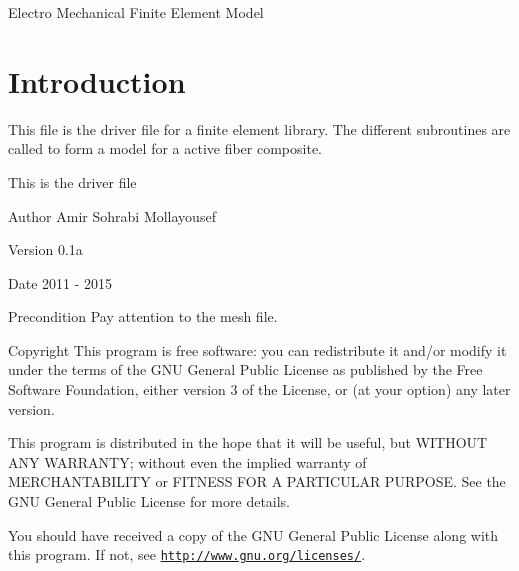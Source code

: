 Electro Mechanical Finite Element Model \hypertarget{index_intro_sec}{}\section{Introduction}\label{index_intro_sec}
This file is the driver file for a finite element library. The different subroutines are called to form a model for a active fiber composite.

This is the driver file \begin{DoxyAuthor}{Author}
Amir Sohrabi Mollayousef 
\end{DoxyAuthor}
\begin{DoxyVersion}{Version}
0.\+1a 
\end{DoxyVersion}
\begin{DoxyDate}{Date}
2011 -\/ 2015 
\end{DoxyDate}
\begin{DoxyPrecond}{Precondition}
Pay attention to the mesh file. 
\end{DoxyPrecond}
\begin{DoxyCopyright}{Copyright}
This program is free software\+: you can redistribute it and/or modify it under the terms of the G\+N\+U General Public License as published by the Free Software Foundation, either version 3 of the License, or (at your option) any later version.
\end{DoxyCopyright}
This program is distributed in the hope that it will be useful, but W\+I\+T\+H\+O\+U\+T A\+N\+Y W\+A\+R\+R\+A\+N\+T\+Y; without even the implied warranty of M\+E\+R\+C\+H\+A\+N\+T\+A\+B\+I\+L\+I\+T\+Y or F\+I\+T\+N\+E\+S\+S F\+O\+R A P\+A\+R\+T\+I\+C\+U\+L\+A\+R P\+U\+R\+P\+O\+S\+E. See the G\+N\+U General Public License for more details.

You should have received a copy of the G\+N\+U General Public License along with this program. If not, see \href{http://www.gnu.org/licenses/}{\tt http\+://www.\+gnu.\+org/licenses/}. 